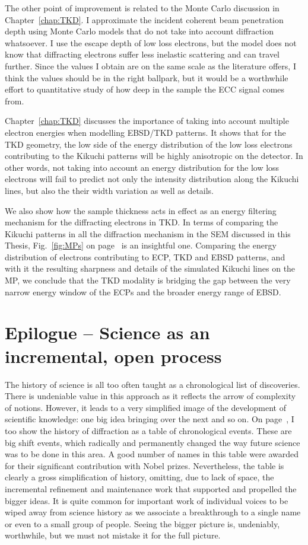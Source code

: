 The other point of improvement is related to the Monte Carlo discussion in Chapter~\ref{chap:TKD}. I approximate the incident coherent beam penetration depth using Monte Carlo models that do not take into account diffraction whatsoever. I use the escape depth of low loss electrons, but the model does not know that diffracting electrons suffer less inelastic scattering and can travel further. Since the values I obtain are on the same scale as the literature offers, I think the values should be in the right ballpark, but it would be a worthwhile effort to quantitative study of how deep in the sample the ECC signal comes from.

Chapter~\ref{chap:TKD} discusses the importance of taking into account multiple electron energies when modelling EBSD/TKD patterns. It shows that for the TKD geometry, the low side of the energy distribution of the low loss electrons contributing to the Kikuchi patterns will be highly anisotropic on the detector. In other words, not taking into account an energy distribution for the low loss electrons will fail to predict not only the intensity distribution along the Kikuchi lines, but also the their width variation as well as details.

We also show how the sample thickness acts in effect as an energy filtering mechanism for the diffracting electrons in TKD. In terms of comparing the Kikuchi patterns in all the diffraction mechanism in the SEM discussed in this Thesis, Fig.~\ref{fig:MPs} on page~\pageref{fig:MPs} is an insightful one. Comparing the energy distribution of electrons contributing to ECP, TKD and EBSD patterns, and with it the resulting sharpness and details of the simulated Kikuchi lines on the MP, we conclude that the TKD modality is bridging the gap between the very narrow energy window of the ECPs and the broader energy range of EBSD. 


\section{Epilogue -- Science as an incremental, open process}
\label{sec:Epilogue}
The history of science is all too often taught as a chronological list of discoveries. There is undeniable value in this approach as it reflects the arrow of complexity of notions. However, it leads to a very simplified image of the development of scientific knowledge: one big idea bringing over the next and so on. On page~\pageref{table:historyDiff}, I too show the history of diffraction as a table of chronological events. These are big shift events, which radically and permanently changed the way future science was to be done in this area. A good number of names in this table were awarded for their significant contribution with Nobel prizes. Nevertheless, the table is clearly a gross simplification of history, omitting, due to lack of space, the incremental refinement and maintenance work that supported and propelled the bigger ideas. It is quite common for important work of individual voices to be wiped away from science history as we associate a breakthrough to a single name or even to a small group of people. Seeing the bigger picture is, undeniably, worthwhile, but we must not mistake it for the full picture.

